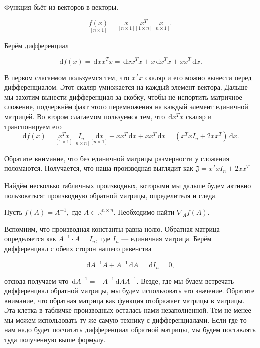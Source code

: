 \documentclass[12pt,fleqn]{article}
\newcommand{\dx}[1]{\,\mathrm{d}#1} %
\begin{document}
\begin{esSolution} Функция бьёт из векторов в векторы. 

\[ 
\underset{[n \times 1]}{f(x)} = \underset{[n \times 1]}{x} \underset{[1 \times n]}{x^T}  \underset{[n \times 1]}{x}.
\]

Берём дифференциал 

\[
\dx{f(x)} = \dx{xx^Tx} = \dx{x}x^Tx + x \dx{x^T} x + xx^T\dx{x}.
\]

В первом слагаемом пользуемся тем, что $x^Tx$ скаляр и его можно вынести перед дифференциалом. Этот скаляр умножается на каждый элемент вектора. Дальше мы захотим вынести дифференциал за скобку, чтобы не испортить матричное сложение, подчеркнём факт этого перемножения на каждый элемент единичной матрицей. Во втором слагаемом пользуемся тем, что $\dx{x^T} x$ скаляр и транспонируем его 
\[
\dx{f(x)} = \underset{[1 \times 1]}{x^Tx} \underset{[n \times n]}{I_n} \underset{[n \times 1]}{\dx{x}} + x x^T \dx{x} + xx^T\dx{x} = (x^Tx I_n + 2 x x^T)\dx{x}.
\]

Обратите внимание, что без единичной матрицы размерности у сложения поломаются. Получается, что наша производная выглядит как $\mathfrak{J} = x^Tx I_n + 2 x x^T$
\end{esSolution}


Найдём несколько табличных производных, которыми мы дальше будем активно пользоваться: производную обратной матрицы, определителя и следа. 

\begin{vkProblem} Пусть  $f(A) = A^{-1},$ где $A \in \mathbb{R}^{n\times n}.$  Необходимо найти $\nabla_A f(A)$.
\end{vkProblem}

\begin{esSolution}
Вспомним, что производная константы равна нолю. Обратная матрица определяется как $A^{-1} \cdot A = I_n,$ где $I_n$ --- единичная матрица. Берём дифференциал с обеих сторон нашего равенства 

\[
\dx{A^{-1}} A + A^{-1} \dx{A} = \dx{I_n} = 0,
\]

отсюда получаем что $\dx{A^{-1}} = - A^{-1} \dx{A} A^{-1}.$ Везде, где мы будем встречать дифференциал обратной матрицы, мы будем использовать это значение.  Обратите внимание, что обратная матрица как функция отображает матрицы в матрицы. Эта клетка в табличке производных осталась нами незаполненной. Тем не менее мы можем использовать ту же самую технику с дифференциалами. Если где-то нам надо будет посчитать дифференциал обратной матрицы, мы будем поставлять туда полученную выше формулу. 
\end{esSolution}
\end{document}
